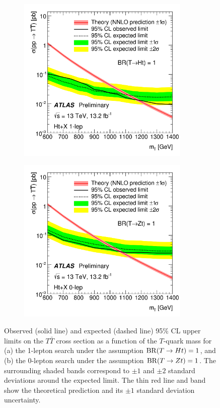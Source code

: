 \begin{figure}[h!]
\begin{subfigure}{0.5\textwidth}
  \centering
  \includegraphics[width=0.9\textwidth]{figures/VLQ/fig_15a.png}
  \caption{}
  \label{}
\end{subfigure}
\begin{subfigure}{0.5\textwidth}
  \centering
  \includegraphics[width=0.9\textwidth]{figures/VLQ/fig_15b.png}
  \caption{}
  \label{}
\end{subfigure}
\captionsetup{width=0.85\textwidth} \caption{\small Observed (solid line) and expected (dashed line) 95\% CL upper limits on the $T\bar{T}$ cross section as a function of the $T$-quark mass 
for (a) the 1-lepton search under the assumption ${\rm BR}(T \to Ht)=1$, and (b) the 0-lepton search under the assumption ${\rm BR}(T \to Zt)=1$.
The surrounding shaded bands correspond to $\pm1$ and $\pm2$ standard deviations around the expected limit. 
The thin red line and band show the theoretical prediction and its $\pm1$ standard deviation uncertainty.}
\label{sec:vlq:fig:centlimit}
\end{figure}


